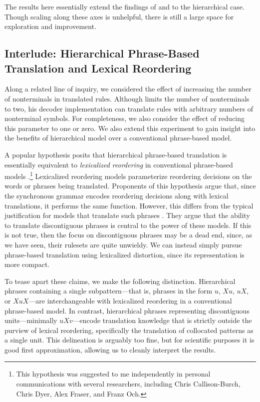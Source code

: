 The results here essentially extend the findings of \citet{Koehn:2003:naacl}
and \citet{Zens:2007:hlt-naacl} to the hierarchical case.  Though
scaling along these axes is unhelpful, there is still a large space
for exploration and improvement.

\subsection{Interlude: Hierarchical Phrase-Based Translation and Lexical Reordering}
\label{sec:lexicalized-reordering}

Along a related line of inquiry, we considered the effect of increasing the number of 
nonterminals in translated rules.  Although \citet{Chiang:2007:cl}
limits the number of nonterminals to two, his decoder implementation
can translate rules with arbitrary numbers of nonterminal symbols.
For completeness, we also consider the effect of reducing
this parameter to one or zero.  We also extend this experiment
to gain insight into the benefits of hierarchical model over a
conventional phrase-based model.

A popular hypothesis posits that 
hierarchical phrase-based translation is essentially
equivalent to {\em lexicalized reordering} in conventional phrase-based models
\citep{Tillman:2004:hlt-naacl,Koehn:2005:iwslt,Al-Onaizan:2006:acl-coling}.\footnote{
This hypothesis was suggested to me
independently in personal communications with several researchers, 
including Chris Callison-Burch, Chris Dyer, Alex Fraser, and Franz Och.}
Lexicalized reordering models parameterize reordering decisions on the
words or phrases being translated.  Proponents of this hypothesis
argue that, since the synchronous grammar encodes reordering decisions
along with lexical translations, it performs the same function.  However,
this differs from the typical justification for models that translate
such phrases \citep[e.g.]{Chiang:2007:cl,Simard:2005:hlt-emnlp,Quirk:2006:hlt-naacl}.
They argue that the ability to translate discontiguous phrases is central
to the power of these models.  If this is not true, then the focus on
discontiguous phrases may be a dead end, since, as we have seen, their
rulesets are quite unwieldy.  We can instead simply pursue phrase-based
translation using lexicalized distortion, since its representation is
more compact.

To tease apart these claims, we make the 
following distinction.  Hierarchical phrases
containing a single subpattern---that is,
phrases in the form $u$, $Xu$, $uX$, or $XuX$---are
interchangeable with lexicalized reordering in a conventional
phrase-based model.  In contrast, hierarchical phrases
representing discontiguous units---minimally $uXv$---encode
translation knowledge that is strictly outside the purview
of lexical reordering, specifically the translation of collocated
patterns as a single unit.  This delineation is arguably too fine,
but for scientific purposes it is good first approximation,
allowing us to cleanly interpret the results.

